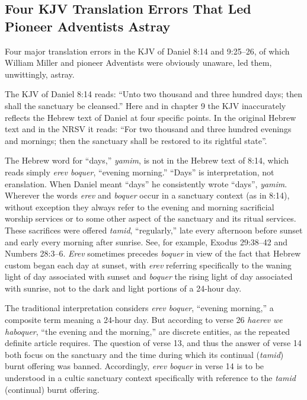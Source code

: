 \subsection{Four KJV Translation Errors That Led Pioneer Adventists Astray}

Four major translation errors in the KJV of Daniel 8:14 and 9:25--26, of
which William Miller and pioneer Adventists were obviously unaware, led
them, unwittingly, astray.

The KJV of Daniel 8:14 reads: ``Unto two thousand and three hundred days;
then shall the sanctuary be cleansed.'' Here and in chapter 9 the KJV
inaccurately reflects the Hebrew text of Daniel at four specific points. In
the original Hebrew text and in the NRSV it reads: ``For two thousand and
three hundred evenings and mornings; then the sanctuary shall be restored
to its rightful state''.

The Hebrew word for ``days,'' \textit{yamim}, is not in the Hebrew text of 8:14, which
reads simply \textit{erev boquer}, ``evening morning.'' ``Days'' is interpretation, not
eranslation. When Daniel meant ``days'' he consistently wrote ``days'',
\textit{yamim}. Wherever the words \textit{erev} and \textit{boquer} occur in a sanctuary context
(as in 8:14), without exception they always refer to the evening and morning
sacrificial worship services or to some other aspect of the sanctuary and
its ritual services. These sacrifices were offered \textit{tamid}, ``regularly,'' late
every afternoon before sunset and early every morning after sunrise. See,
for example, Exodus 29:38--42 and Numbers 28:3--6. \textit{Erev} sometimes precedes
\textit{boquer} in view of the fact that Hebrew custom began each day at sunset, with
\textit{erev} referring specifically to the waning light of day associated with
sunset and \textit{boquer} the rising light of day associated with sunrise, not to
the dark and light portions of a 24-hour day.

The traditional interpretation considers \textit{erev boquer}, ``evening morning,'' a
composite term meaning a 24-hour day. But according to verse 26 \textit{haerev we
haboquer}, ``the evening and the morning,'' are discrete entities, as the
repeated definite article requires. The question of verse 13, and thus the
answer of verse 14 both focus on the sanctuary and the time during which its
continual (\textit{tamid}) burnt offering was banned. Accordingly, \textit{erev boquer} in
verse 14 is to be understood in a cultic sanctuary context specifically with
reference to the \textit{tamid} (continual) burnt offering.

